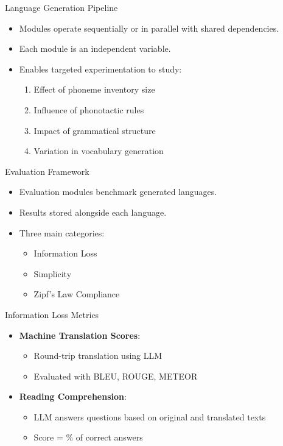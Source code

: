 \documentclass{beamer}
\begin{document}
\begin{frame}{Language Generation Pipeline}
	\begin{itemize}
		\item Modules operate sequentially or in parallel with shared dependencies.
		\item Each module is an independent variable.
		\item Enables targeted experimentation to study:
		\begin{enumerate}
			\item Effect of phoneme inventory size
			\item Influence of phonotactic rules
			\item Impact of grammatical structure
			\item Variation in vocabulary generation
		\end{enumerate}
	\end{itemize}
\end{frame}

\begin{frame}{Evaluation Framework}
	\begin{itemize}
		\item Evaluation modules benchmark generated languages.
		\item Results stored alongside each language.
		\item Three main categories:
		\begin{itemize}
			\item Information Loss
			\item Simplicity
			\item Zipf's Law Compliance
		\end{itemize}
	\end{itemize}
\end{frame}

\begin{frame}{Information Loss Metrics}
	\begin{itemize}
		\item \textbf{Machine Translation Scores}:
		\begin{itemize}
			\item Round-trip translation using LLM
			\item Evaluated with BLEU, ROUGE, METEOR
		\end{itemize}
		\item \textbf{Reading Comprehension}:
		\begin{itemize}
			\item LLM answers questions based on original and translated texts
			\item Score = \% of correct answers
		\end{itemize}
	\end{itemize}
\end{frame}
\end{document}
